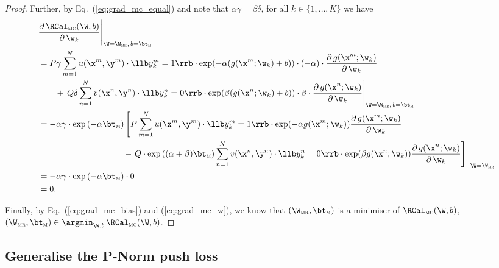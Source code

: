 \begin{proof}
Further, by Eq.~(\ref{eq:grad_mc_equal}) and note that $\alpha \gamma = \beta \delta$, for all $k \in \{1,\dots,K\}$ we have
\begin{equation}
\label{eq:grad_mc_w}
\begin{aligned}
&  \frac{\partial \, \RCal_\textsc{mc}(\W, b)} {\partial \, \w_k} 
   \Bigg|_{\W = \W_\textsc{mr}, \, b = \bt_\textsc{m}} \\
&= P \gamma \sum_{m=1}^N u(\x^m, \y^m) \cdot \llb y_k^m = 1 \rrb \cdot \exp(-\alpha (g(\x^m; \w_k) + b)) \cdot (-\alpha) \cdot 
     \frac{\partial \, g(\x^m; \w_k)}{\partial \, \w_k} \\
&  \hspace{2em} + \,
   Q \delta \sum_{n=1}^N v(\x^n, \y^n) \cdot \llb y_k^n = 0 \rrb \cdot \exp( \beta  (g(\x^n; \w_k) + b)) \cdot \beta \cdot 
     \frac{\partial \, g(\x^n; \w_k)}{\partial \, \w_k} 
     \Bigg|_{\W = \W_\textsc{mr}, \, b = \bt_\textsc{m}} \\
&= -\alpha \gamma \cdot \exp \left( -\alpha \bt_\textsc{m} \right) \left[
   P \sum_{m=1}^N u(\x^m, \y^m) \cdot \llb y_k^m = 1 \rrb \cdot \exp(-\alpha g(\x^m; \w_k)) 
     \frac{\partial \, g(\x^m; \w_k)}{\partial \, \w_k} \right. \\
&  \hspace{10em} - \left.
   Q \cdot \exp \left( (\alpha + \beta) \bt_\textsc{m} \right)
   \sum_{n=1}^N v(\x^n, \y^n) \cdot \llb y_k^n = 0 \rrb \cdot \exp( \beta  g(\x^n; \w_k)) 
   \frac{\partial \, g(\x^n; \w_k)}{\partial \, \w_k} \right]
   \Bigg|_{\W = \W_\textsc{mr}} \\
&= -\alpha \gamma \cdot \exp \left( -\alpha \bt_\textsc{m} \right) \cdot 0 \\
&= 0.
\end{aligned}
\end{equation}

Finally, by Eq.~(\ref{eq:grad_mc_bias}) and (\ref{eq:grad_mc_w}), 
we know that $(\W_\textsc{mr}, \bt_\textsc{m})$ is a minimiser of $\RCal_\textsc{mc}(\W, b)$, 
\ie $(\W_\textsc{mr}, \bt_\textsc{m}) \in \argmin_{\W,b} \, \RCal_\textsc{mc}(\W, b)$.
\end{proof}



\subsection{Generalise the P-Norm push loss}

